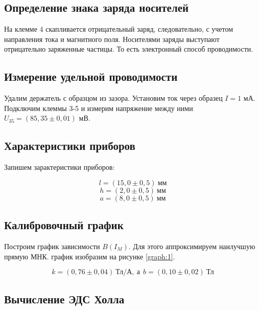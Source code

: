 \documentclass[a4paper,12pt]{article}
\begin{document}
\subsection{Определение знака заряда носителей}

На клемме 4 скапливается отрицательный заряд, следовательно, с учетом направления тока и магнитного поля. Носителями заряды выступают отрицательно заряженные частицы. То есть электронный способ проводимости.

\subsection{Измерение удельной проводимости}

Удалим держатель с образцом из зазора. Установим ток через образец $I = 1$ мА. Подключим клеммы 3-5 и измерим напряжение между ними $U_{35} = (85,35 \pm 0,01)$ мВ.

\subsection{Характеристики приборов}

Запишем зарактеристики приборов:

\begin{equation*}
    l = (15,0 \pm 0,5) \ \text{мм}
\end{equation*}
\begin{equation*}
    h = (2,0 \pm 0,5) \ \text{мм}
\end{equation*}
\begin{equation*}
    a = (8,0 \pm 0,5) \ \text{мм}
\end{equation*}

\subsection{Калибровочный график}

Построим график зависимости $B(I_M)$. Для этого аппроксимируем наилучшую прямую МНК. график изобразим на рисунке \ref{graph:1}.


\begin{equation}\label{eq:mnk}
    k = (0,76 \pm 0,04) \ \text{Тл}/\text{А},
    \ \text{а} \ \  b = (0,10 \pm 0,02) \ \text{Тл}
\end{equation}

\subsection{Вычисление ЭДС Холла}
\end{document}
